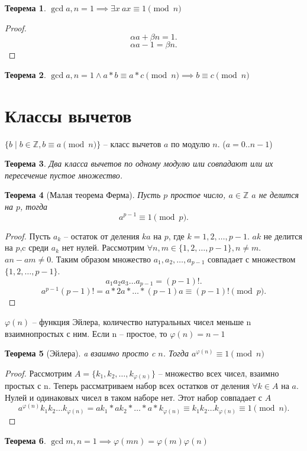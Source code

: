 \documentclass{scrarticle}
\newtheorem{theorem}{Теорема}
\begin{document}
        \begin{theorem}
            $\gcd{a,n} = 1 \implies \exists x ~  ax \equiv 1 \pmod{n}$
        \end{theorem}
        \begin{proof}
            \[
                \alpha a + \beta n = 1
            .\] 
            \[
                \alpha a - 1 = \beta n
            .\] 
        \end{proof}
        \begin{theorem}
            $\gcd{a,n} = 1 \land a*b \equiv a * c \pmod{n} \implies b \equiv c \pmod{n}$
        \end{theorem}
        \section{Классы вычетов}
        $\{b \mid b \in \mathbb{Z} , b \equiv a \pmod{n}\}$ -- класс вычетов $a$ по модулю  $n$. ($a = 0..n-1$)
        \begin{theorem}
            Два класса вычетов по одному модулю или совпадают или их пересечение пустое множество.
        \end{theorem}
        \begin{theorem}[Малая теорема Ферма]
            Пусть $p$ простое число,  $a \in \mathbb{Z}$ $a$ не делится на  $p$, тогда
             \[
                 a^{p - 1} \equiv 1 \pmod{p}
            .\] 
        \end{theorem}
        \begin{proof}
            Пусть $a_k$ -- остаток от деления $ka$ на  $p$, где  $k = 1,2,\dots,p-1$. $ak$ не делится на  $p$,c среди $a_k$ нет нулей. Рассмотрим  $\forall n,m \in \{1,2,\dots,p-1\}, n \neq m$. $an - am \neq 0$. Таким образом множество $a_1,a_2,\dots,a_{p - 1}$ совпадает с множеством $\{ 1,2,\dots,p-1 \}$.
            \[
                a_1 a_2 a_3 \dots a_{p-1} = (p - 1)!
            .\] 
            \[
                a^{p - 1} (p - 1)! = a * 2a * \dots * (p - 1)a \equiv (p - 1)! \pmod{p}
            .\] 
        \end{proof}
        $\varphi(n)$ -- функция Эйлера, количество натуральных чисел меньше n взаимнопростых с ним. Если n -- простое, то  $\varphi(n) = n - 1$
        \begin{theorem}[Эйлера]
            a взаимно просто c $n$. Тогда  $a^{\varphi(n)} \equiv 1 \pmod{n}$
        \end{theorem}
        \begin{proof}
            Рассмотрим  $A = \{k_1,k_2, \dots ,k_{\varphi(n)}\}$ -- множество всех чисел, взаимно простых с n. Теперь рассматриваем набор всех остатков от деления $\forall  k \in A$ на $a$. Нулей и одинаковых чисел в таком наборе нет. Этот набор совпадает с $A$
             \[
                 a^{\varphi(n)}k_1k_2\dots k_{\varphi(n)}  = ak_1 * ak_2 * \dots * a*k_{\varphi(n)} \equiv k_1 k_2 \dots k_{\varphi(n)} \equiv 1 \pmod{n}
            .\]
        \end{proof}
        \begin{theorem}
            $\gcd{m,n} = 1 \implies \varphi(mn) = \varphi(m)\varphi(n)$
        \end{theorem}
\end{document}
